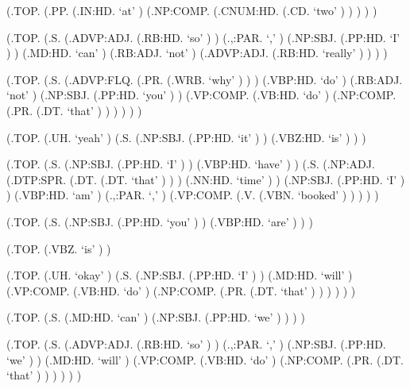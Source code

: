 \documentclass[10pt]{article}
\begin{document}
\begin{parsetree}  (.TOP. (.PP. (.IN:HD. `at' ) (.NP:COMP. (.CNUM:HD. (.CD. `two' ) ) ) ) ) \end{parsetree}

\begin{parsetree}  (.TOP. (.S. (.ADVP:ADJ. (.RB:HD. `so' ) ) (.,:PAR. `,' ) (.NP:SBJ. (.PP:HD. `I' ) ) (.MD:HD. `can' ) (.RB:ADJ. `not' ) (.ADVP:ADJ. (.RB:HD. `really' ) ) ) ) \end{parsetree}

\begin{parsetree}  (.TOP. (.S. (.ADVP:FLQ. (.PR. (.WRB. `why' ) ) ) (.VBP:HD. `do' ) (.RB:ADJ. `not' ) (.NP:SBJ. (.PP:HD. `you' ) ) (.VP:COMP. (.VB:HD. `do' ) (.NP:COMP. (.PR. (.DT. `that' ) ) ) ) ) ) \end{parsetree}

\begin{parsetree}  (.TOP. (.UH. `yeah' ) (.S. (.NP:SBJ. (.PP:HD. `it' ) ) (.VBZ:HD. `is' ) ) ) \end{parsetree}

\begin{parsetree}  (.TOP. (.S. (.NP:SBJ. (.PP:HD. `I' ) ) (.VBP:HD. `have' ) ) (.S. (.NP:ADJ. (.DTP:SPR. (.DT. (.DT. `that' ) ) ) (.NN:HD. `time' ) ) (.NP:SBJ. (.PP:HD. `I' ) ) (.VBP:HD. `am' ) (.,:PAR. `,' ) (.VP:COMP. (.V. (.VBN. `booked' ) ) ) ) ) \end{parsetree}

\begin{parsetree}  (.TOP. (.S. (.NP:SBJ. (.PP:HD. `you' ) ) (.VBP:HD. `are' ) ) ) \end{parsetree}

\begin{parsetree}  (.TOP. (.VBZ. `is' ) ) \end{parsetree}

\begin{parsetree}  (.TOP. (.UH. `okay' ) (.S. (.NP:SBJ. (.PP:HD. `I' ) ) (.MD:HD. `will' ) (.VP:COMP. (.VB:HD. `do' ) (.NP:COMP. (.PR. (.DT. `that' ) ) ) ) ) ) \end{parsetree}

\begin{parsetree}  (.TOP. (.S. (.MD:HD. `can' ) (.NP:SBJ. (.PP:HD. `we' ) ) ) ) \end{parsetree}

\begin{parsetree}  (.TOP. (.S. (.ADVP:ADJ. (.RB:HD. `so' ) ) (.,:PAR. `,' ) (.NP:SBJ. (.PP:HD. `we' ) ) (.MD:HD. `will' ) (.VP:COMP. (.VB:HD. `do' ) (.NP:COMP. (.PR. (.DT. `that' ) ) ) ) ) ) \end{parsetree}
\end{document}
